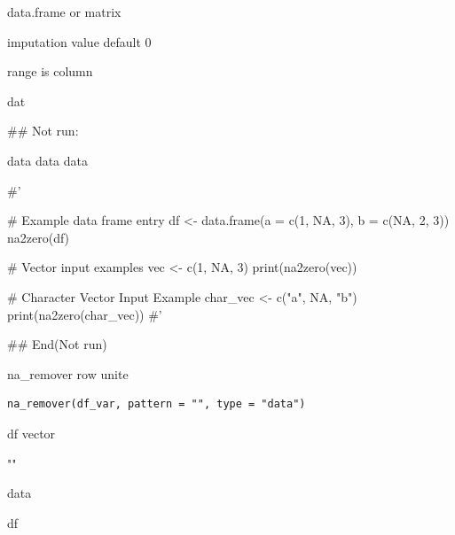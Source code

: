 \documentclass[a4paper]{book}
\begin{document}
%
\begin{Arguments}
\begin{ldescription}
\item[\code{data}] data.frame or matrix

\item[\code{imp}] imputation value default 0

\item[\code{range}] range is column
\end{ldescription}
\end{Arguments}
%
\begin{Value}
dat
\end{Value}
%
\begin{Examples}
\begin{ExampleCode}

## Not run: 

data %
data %
data %

#'

# Example data frame entry
df <- data.frame(a = c(1, NA, 3), b = c(NA, 2, 3))
na2zero(df)

# Vector input examples
vec <- c(1, NA, 3)
print(na2zero(vec))

# Character Vector Input Example
char_vec <- c("a", NA, "b")
print(na2zero(char_vec))
#'


## End(Not run)

\end{ExampleCode}
\end{Examples}
%
\begin{Description}
na\_remover row unite
\end{Description}
%
\begin{Usage}
\begin{verbatim}
na_remover(df_var, pattern = "", type = "data")
\end{verbatim}
\end{Usage}
%
\begin{Arguments}
\begin{ldescription}
\item[\code{df\_var}] df vector

\item[\code{pattern}] ""

\item[\code{type}] data
\end{ldescription}
\end{Arguments}
%
\begin{Value}
df
\end{Value}
\end{document}
